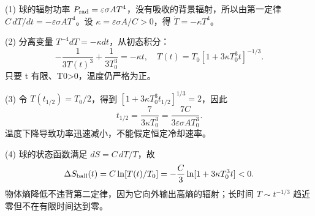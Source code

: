 (1) 球的辐射功率 \(P_{\rm rad}=\varepsilon\sigma A T^4\)，没有吸收的背景辐射，所以由第一定律 \(C\,dT/dt=-\varepsilon\sigma A T^4\)。设 \(\kappa=\varepsilon\sigma A/C>0\)，得 \(\dot T=-\kappa T^4\)。

(2) 分离变量 \(T^{-4}dT=-\kappa dt\)，从初态积分：
\[
-\frac1{3T(t)^3}+\frac1{3T_0^3}=-\kappa t,
\quad
T(t)=T_0[1+3\kappa T_0^3t]^{-1/3}.
\]
只要 t 有限、T0>0，温度仍严格为正。

(3) 令 \(T(t_{1/2})=T_0/2\)，得到 \([1+3\kappa T_0^3t_{1/2}]^{1/3}=2\)，因此
\[
t_{1/2}=\frac7{3\kappa T_0^3}
=\frac{7C}{3\varepsilon\sigma A T_0^3}.
\]
温度下降导致功率迅速减小，不能假定恒定冷却速率。

(4) 球的状态函数满足 \(dS=C\,dT/T\)，故
\[
\Delta S_{\rm ball}(t)=C\ln[T(t)/T_0]
=-\frac C3\ln[1+3\kappa T_0^3t]<0.
\]
物体熵降低不违背第二定律，因为它向外输出高熵的辐射；长时间 \(T\sim t^{-1/3}\) 趋近零但不在有限时间达到零。
